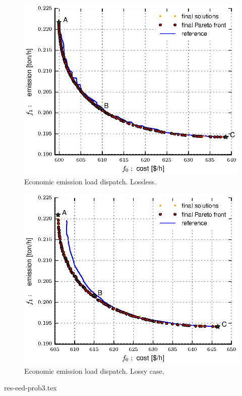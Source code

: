 \documentclass[final,5p,times,twocolumn]{elsarticle}
\begin{document}
\begin{figure} \centering
\includegraphics[width=\linewidth]{./figs/res/ecoemission_prob3.eps}
\caption{Economic emission load dispatch. Lossless.}
\label{fig:eedLossless}
\end{figure}

\begin{figure} \centering
\includegraphics[width=\linewidth]{./figs/res/ecoemission_prob4.eps}
\caption{Economic emission load dispatch. Lossy case.} 
\label{fig:eedLossy} 
\end{figure}

{res-eed-prob3.tex}
\end{document}
